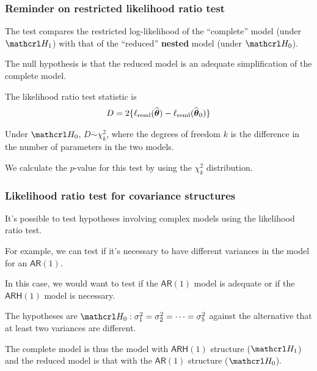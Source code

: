 \documentclass{beamer}
\begin{document}
\begin{frame}
\frametitle{Reminder on restricted likelihood ratio test}

\bi
\item The test compares the restricted log-likelihood of the ``complete'' model (under $\Hy_1$) with that of the ``reduced'' \alert{\textbf{nested}} model (under $\Hy_0$).
\item The null hypothesis is that the reduced model is an adequate simplification of the complete model.
\item The likelihood ratio test statistic is
\begin{align*}
D=2\{\ell_{\textrm{reml}}(\widehat{\boldsymbol {\theta}})- \ell_{\textrm{reml}}(\widehat{\boldsymbol {\theta}}_0)\} \end{align*}
\item Under $\Hy_0$, $D \stackrel{\cdot}{\sim}\chi^2_k$, where the degrees of freedom $k$ is the difference in the number of parameters in the two models. 
\item We calculate the $p$-value for this test by using the $\chi^2_k$ distribution.
\ei
\end{frame}
\begin{frame}[fragile]
\frametitle{Likelihood ratio test for covariance structures}
\bi
\item It's possible to test hypotheses involving complex models using the likelihood ratio test. 
\item For example, we can test if it's necessary to have different variances in the model for an $\mathsf{AR}(1)$.
\item In this case, we would want to test if the $\mathsf{AR}(1)$ model is adequate or if the $\mathsf{ARH}(1)$ model is necessary.
\item The hypotheses are $
\Hy_0: \sigma_1^2=\sigma_2^2=\cdots=\sigma_5^2$ against the alternative that at least two variances are different.
\item The \alert{complete model} is thus the model with $\mathsf{ARH}(1)$ structure ($\Hy_1$) and the \alert{reduced model} is that with the $\mathsf{AR}(1)$ structure ($\Hy_0$).
\ei
\end{frame}
\end{document}
